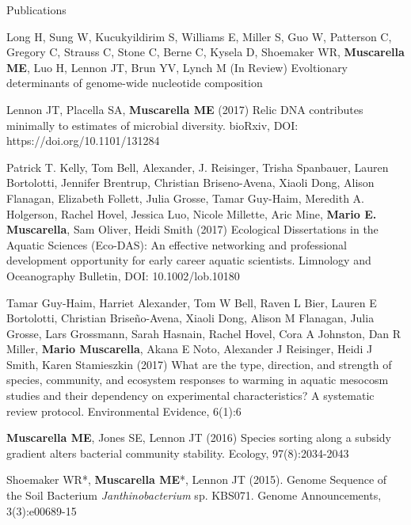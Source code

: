 \documentclass{resume} %
\begin{document}
\begin{rSection}{Publications}

Long H, Sung W, Kucukyildirim S, Williams E, Miller S, Guo W, Patterson C, Gregory C, Strauss C, Stone C, Berne C, Kysela D, Shoemaker WR, {\bf Muscarella ME}, Luo H, Lennon JT, Brun YV, Lynch M (In Review) Evoltionary determinants of genome-wide nucleotide composition

 Lennon JT, Placella SA, {\bf Muscarella ME} (2017) Relic DNA contributes minimally to estimates of microbial diversity. bioRxiv, DOI: https://doi.org/10.1101/131284

Patrick T. Kelly, Tom Bell, Alexander, J. Reisinger, Trisha Spanbauer, Lauren Bortolotti, Jennifer Brentrup, Christian Briseno-Avena, Xiaoli Dong, Alison Flanagan, Elizabeth Follett, Julia Grosse, Tamar Guy-Haim, Meredith A. Holgerson, Rachel Hovel, Jessica Luo, Nicole Millette, Aric Mine, {\bf Mario E. Muscarella}, Sam Oliver, Heidi Smith (2017) Ecological Dissertations in the Aquatic Sciences (Eco-DAS): An effective networking and professional development opportunity for early career aquatic scientists. Limnology and Oceanography Bulletin, DOI: 10.1002/lob.10180

Tamar Guy-Haim, Harriet Alexander, Tom W Bell, Raven L Bier, Lauren E
Bortolotti, Christian Briseño-Avena, Xiaoli Dong, Alison M Flanagan, Julia
Grosse, Lars Grossmann, Sarah Hasnain, Rachel Hovel, Cora A Johnston, Dan R
Miller, {\bf Mario Muscarella}, Akana E Noto, Alexander J Reisinger, Heidi J
Smith, Karen Stamieszkin (2017) What are the type, direction, and strength
of species, community, and ecosystem responses to warming in aquatic mesocosm
studies and their dependency on experimental characteristics? A systematic
review protocol. Environmental Evidence, 6(1):6

{\bf Muscarella ME}, Jones SE, Lennon JT (2016) Species sorting along a
subsidy gradient alters bacterial community stability. Ecology, 97(8):2034-2043

Shoemaker WR*, {\bf Muscarella ME}*, Lennon JT (2015). Genome Sequence of the
Soil Bacterium {\em Janthinobacterium} sp. KBS071. Genome Announcements,
3(3):e00689-15


\end{rSection}
\end{document}
